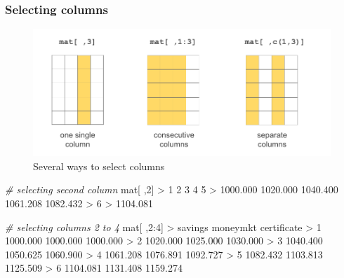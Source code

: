\documentclass[
]{book}
\newenvironment{Shaded}{\begin{snugshade}}{\end{snugshade}}
\newcommand{\CommentTok}[1]{\textcolor[rgb]{0.56,0.35,0.01}{\textit{#1}}}
\newcommand{\DecValTok}[1]{\textcolor[rgb]{0.00,0.00,0.81}{#1}}
\newcommand{\FloatTok}[1]{\textcolor[rgb]{0.00,0.00,0.81}{#1}}
\newcommand{\NormalTok}[1]{#1}
\newcommand{\SpecialCharTok}[1]{\textcolor[rgb]{0.00,0.00,0.00}{#1}}
\begin{document}
\hypertarget{selecting-columns}{%
\subsubsection*{Selecting columns}\label{selecting-columns}}

\begin{figure}

{\centering \includegraphics[width=0.8\linewidth]{images/objects/obj-matrix-cols1} 

}

\caption{Several ways to select columns}\label{fig:unnamed-chunk-128}
\end{figure}

\begin{Shaded}
\begin{Highlighting}[]
\CommentTok{\# selecting second column}
\NormalTok{mat[ ,}\DecValTok{2}\NormalTok{]}
\SpecialCharTok{\textgreater{}}        \DecValTok{1}        \DecValTok{2}        \DecValTok{3}        \DecValTok{4}        \DecValTok{5} 
\SpecialCharTok{\textgreater{}} \FloatTok{1000.000} \FloatTok{1020.000} \FloatTok{1040.400} \FloatTok{1061.208} \FloatTok{1082.432} 
\SpecialCharTok{\textgreater{}}        \DecValTok{6} 
\SpecialCharTok{\textgreater{}} \FloatTok{1104.081}

\CommentTok{\# selecting columns 2 to 4}
\NormalTok{mat[ ,}\DecValTok{2}\SpecialCharTok{:}\DecValTok{4}\NormalTok{]}
\SpecialCharTok{\textgreater{}}\NormalTok{    savings moneymkt certificate}
\SpecialCharTok{\textgreater{}} \DecValTok{1} \FloatTok{1000.000} \FloatTok{1000.000}    \FloatTok{1000.000}
\SpecialCharTok{\textgreater{}} \DecValTok{2} \FloatTok{1020.000} \FloatTok{1025.000}    \FloatTok{1030.000}
\SpecialCharTok{\textgreater{}} \DecValTok{3} \FloatTok{1040.400} \FloatTok{1050.625}    \FloatTok{1060.900}
\SpecialCharTok{\textgreater{}} \DecValTok{4} \FloatTok{1061.208} \FloatTok{1076.891}    \FloatTok{1092.727}
\SpecialCharTok{\textgreater{}} \DecValTok{5} \FloatTok{1082.432} \FloatTok{1103.813}    \FloatTok{1125.509}
\SpecialCharTok{\textgreater{}} \DecValTok{6} \FloatTok{1104.081} \FloatTok{1131.408}    \FloatTok{1159.274}
\end{Highlighting}
\end{Shaded}
\end{document}
